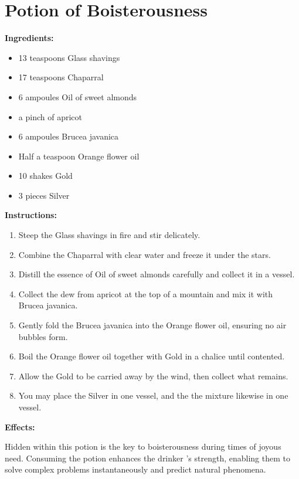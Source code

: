 \documentclass{article}
\begin{document}
\newpage
\section*{Potion of Boisterousness}

\textbf{Ingredients:}

\begin{itemize}
  \item 13 teaspoons Glass shavings
  \item 17 teaspoons Chaparral
  \item 6 ampoules Oil of sweet almonds
  \item a pinch of apricot
  \item 6 ampoules Brucea javanica
  \item Half a teaspoon Orange flower oil
  \item 10 shakes Gold
  \item 3 pieces Silver
\end{itemize}

\textbf{Instructions:}

\begin{enumerate}
  \item Steep the Glass shavings in fire and stir delicately.
  \item Combine the Chaparral with clear water and freeze it under the stars.
  \item Distill the essence of Oil of sweet almonds carefully and collect it in a vessel.
  \item Collect the dew from apricot at the top of a mountain and mix it with Brucea javanica.
  \item Gently fold the Brucea javanica into the Orange flower oil, ensuring no air bubbles form.
  \item Boil the Orange flower oil together with Gold in a chalice until contented.
  \item Allow the Gold to be carried away by the wind, then collect what remains.
  \item You may place the Silver in one vessel, and the the mixture likewise in one vessel.
\end{enumerate}

\textbf{Effects:}

Hidden within this potion is the key to boisterousness during times of joyous need. Consuming the potion enhances the drinker 's strength, enabling them to solve complex problems instantaneously and predict natural phenomena.
\end{document}
